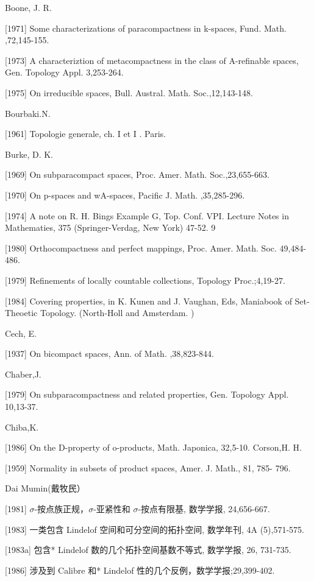 \documentclass[main.tex]{subfiles}
\begin{document}
Boone, J. R.

[1971]
Some characterizations of paracompactness in k-spaces, Fund.
Math. ,72,145-155.

[1973] A characteriztion of metacompactness in the class of A-refinable
spaces, Gen. Topology Appl. 3,253-264.

[1975] On irreducible spaces, Bull. Austral. Math. Soc.,12,143-148.

\noindent Bourbaki.N.

[1961] Topologie generale, ch. I et I . Paris.


\noindent Burke, D. K.

[1969] On subparacompact spaces, Proc. Amer. Math. Soc.,23,655-663.

[1970] On p-spaces and wA-spaces, Pacific J. Math. ,35,285-296.

[1974] A note on R. H. Bings Example G, Top. Conf. VPI. Lecture Notes in
Mathematies, 375 (Springer-Verdag, New York) 47-52. 9

[1980] Orthocompactness and perfect mappings, Proc. Amer. Math. Soc.
49,484-486.

[1979] Refinements of locally countable collections, Topology Proc.;4,19-27.

[1984] Covering properties, in  K. Kunen and J. Vaughan, Eds, Maniabook of Set-Theoetic Topology. (North-Holl and Amsterdam. )


\noindent Cech, E.

[1937] On bicompact spaces, Ann. of Math. ,38,823-844.

\noindent Chaber,J.

[1979] On subparacompactness and related properties, Gen. Topology Appl.
10,13-37.

\noindent Chiba,K.

[1986] On the D-property of o-products, Math. Japonica, 32,5-10.
Corson,H. H.

[1959] Normality in subsets of product spaces, Amer. J. Math., 81, 785-
796.

\noindent Dai Mumin(戴牧民）

[1981] $\sigma$-按点族正规，$\sigma$-亚紧性和 $\sigma$-按点有限基, 数学学报, 24,656-667.

[1983] 一类包含 Lindelof 空间和可分空间的拓扑空间, 数学年刊, 4A
(5),571-575.

[1983a] 包含* Lindelof 数的几个拓扑空间基数不等式, 数学学报, 26, 731-735.

[1986] 涉及到 Calibre 和* Lindelof 性的几个反例，数学学报;29,399-402.
	
\end{document}
